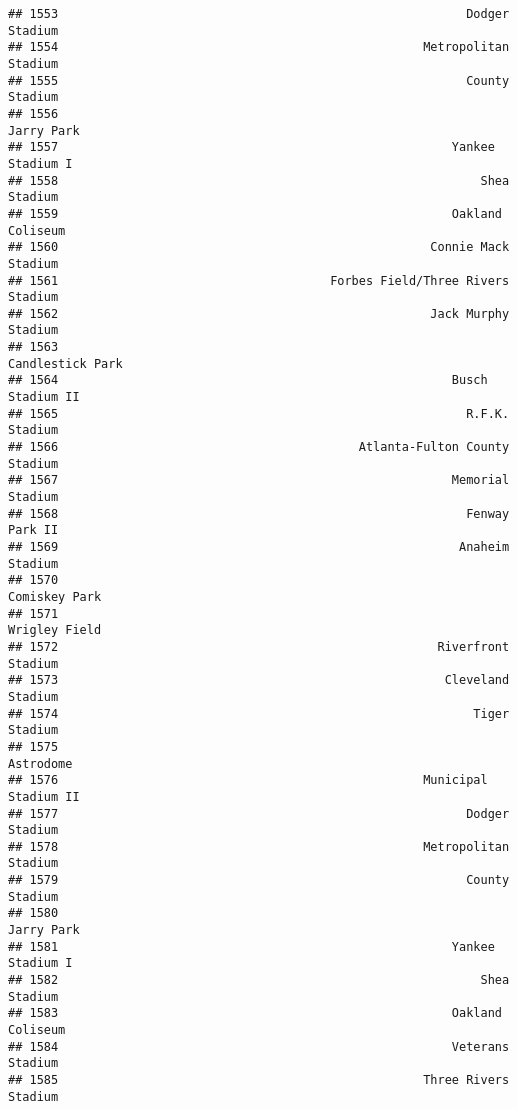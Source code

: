 \documentclass[]{article}
\begin{document}
\begin{verbatim}
## 1553                                                         Dodger Stadium
## 1554                                                   Metropolitan Stadium
## 1555                                                         County Stadium
## 1556                                                             Jarry Park
## 1557                                                       Yankee Stadium I
## 1558                                                           Shea Stadium
## 1559                                                       Oakland Coliseum
## 1560                                                    Connie Mack Stadium
## 1561                                      Forbes Field/Three Rivers Stadium
## 1562                                                    Jack Murphy Stadium
## 1563                                                       Candlestick Park
## 1564                                                       Busch Stadium II
## 1565                                                         R.F.K. Stadium
## 1566                                          Atlanta-Fulton County Stadium
## 1567                                                       Memorial Stadium
## 1568                                                         Fenway Park II
## 1569                                                        Anaheim Stadium
## 1570                                                          Comiskey Park
## 1571                                                          Wrigley Field
## 1572                                                     Riverfront Stadium
## 1573                                                      Cleveland Stadium
## 1574                                                          Tiger Stadium
## 1575                                                              Astrodome
## 1576                                                   Municipal Stadium II
## 1577                                                         Dodger Stadium
## 1578                                                   Metropolitan Stadium
## 1579                                                         County Stadium
## 1580                                                             Jarry Park
## 1581                                                       Yankee Stadium I
## 1582                                                           Shea Stadium
## 1583                                                       Oakland Coliseum
## 1584                                                       Veterans Stadium
## 1585                                                   Three Rivers Stadium

\end{verbatim}
\end{document}
